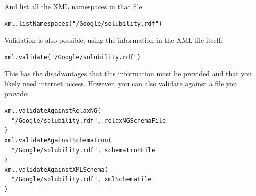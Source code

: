 \documentclass[a5paper, 10pt]{memoir}
\begin{document}
\begin{refsection}
And list all the XML namespaces in that file:
\begin{Verbatim}
xml.listNamespaces("/Google/solubility.rdf")
\end{Verbatim}

Validation is also possible, using the information in the XML file itself:
\begin{Verbatim}
xml.validate("/Google/solubility.rdf")
\end{Verbatim}
This has the disadvantages that this information must be provided and that you likely
need internet access. However, you can also validate against a file you provide:
\begin{Verbatim}
xml.validateAgainstRelaxNG(
  "/Google/solubility.rdf", relaxNGSchemaFile
)
xml.validateAgainstSchematron(
  "/Google/solubility.rdf", schematronFile
)
xml.validateAgainstXMLSchema(
  "/Google/solubility.rdf", xmlSchemaFile
)
\end{Verbatim}


\end{refsection}
\end{document}
